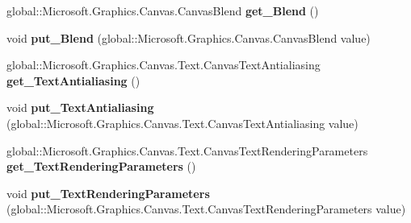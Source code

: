 \begin{DoxyCompactItemize}
\item 
\mbox{\label{interface_microsoft_1_1_graphics_1_1_canvas_1_1_i_canvas_drawing_session_a2c209e6d40098f882a765e1e27adfe8a}} 
global\+::\+Microsoft.\+Graphics.\+Canvas.\+Canvas\+Blend {\bfseries get\+\_\+\+Blend} ()
\item 
\mbox{\label{interface_microsoft_1_1_graphics_1_1_canvas_1_1_i_canvas_drawing_session_a475210a2081ecb997fc9d856df5261a6}} 
void {\bfseries put\+\_\+\+Blend} (global\+::\+Microsoft.\+Graphics.\+Canvas.\+Canvas\+Blend value)
\item 
\mbox{\label{interface_microsoft_1_1_graphics_1_1_canvas_1_1_i_canvas_drawing_session_a7e960d3e2378dfba2a062e1d56223a32}} 
global\+::\+Microsoft.\+Graphics.\+Canvas.\+Text.\+Canvas\+Text\+Antialiasing {\bfseries get\+\_\+\+Text\+Antialiasing} ()
\item 
\mbox{\label{interface_microsoft_1_1_graphics_1_1_canvas_1_1_i_canvas_drawing_session_ac0f6157312e1c0048a7ff516cdadfbad}} 
void {\bfseries put\+\_\+\+Text\+Antialiasing} (global\+::\+Microsoft.\+Graphics.\+Canvas.\+Text.\+Canvas\+Text\+Antialiasing value)
\item 
\mbox{\label{interface_microsoft_1_1_graphics_1_1_canvas_1_1_i_canvas_drawing_session_a944db9f21e80cff0087f0cc6976beacd}} 
global\+::\+Microsoft.\+Graphics.\+Canvas.\+Text.\+Canvas\+Text\+Rendering\+Parameters {\bfseries get\+\_\+\+Text\+Rendering\+Parameters} ()
\item 
\mbox{\label{interface_microsoft_1_1_graphics_1_1_canvas_1_1_i_canvas_drawing_session_ae5b9fe79703be83889afe0433b32cc3b}} 
void {\bfseries put\+\_\+\+Text\+Rendering\+Parameters} (global\+::\+Microsoft.\+Graphics.\+Canvas.\+Text.\+Canvas\+Text\+Rendering\+Parameters value)
\item 
\mbox{\label{interface_microsoft_1_1_graphics_1_1_canvas_1_1_i_canvas_drawing_session_ac927f4306a74e89e87f415ac35750001}} 

\end{DoxyCompactItemize}
